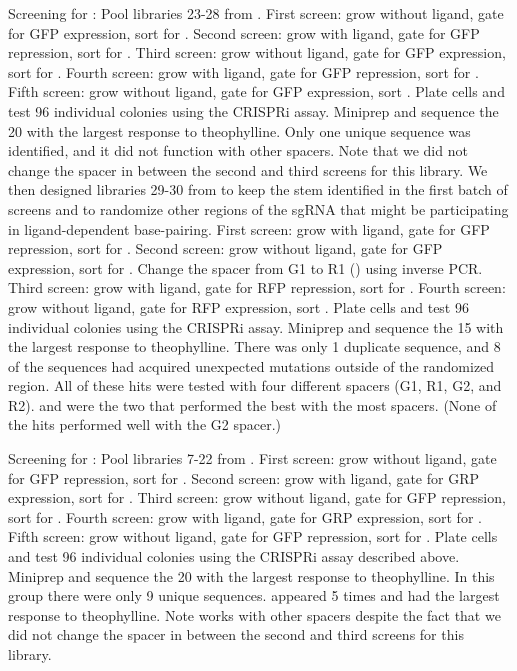 \documentclass[10pt,oneside]{article}
\begin{document}
Screening for \ligrnaF{}: Pool libraries 23-28 from .  First screen: grow without ligand, gate for GFP expression, sort  for .  Second screen: grow with ligand, gate for GFP repression, sort  for .  Third screen: grow without ligand, gate for GFP expression, sort  for .  Fourth screen: grow with ligand, gate for GFP repression, sort  for .  Fifth screen: grow without ligand, gate for GFP expression, sort .  Plate cells and test 96 individual colonies using the CRISPRi assay.  Miniprep and sequence the 20 with the largest response to theophylline.  Only one unique sequence was identified, and it did not function with other spacers.  Note that we did not change the spacer in between the second and third screens for this library.  We then designed libraries 29-30 from  to keep the stem identified in the first batch of screens and to randomize other regions of the sgRNA that might be participating in ligand-dependent base-pairing.  First screen: grow with ligand, gate for GFP repression, sort  for .  Second screen: grow without ligand, gate for GFP expression, sort  for .  Change the spacer from G1 to R1 () using inverse PCR.  Third screen: grow with ligand, gate for RFP repression, sort  for .  Fourth screen: grow without ligand, gate for RFP expression, sort .  Plate cells and test 96 individual colonies using the CRISPRi assay.  Miniprep and sequence the 15 with the largest response to theophylline.  There was only 1 duplicate sequence, and 8 of the sequences had acquired unexpected mutations outside of the randomized region.  All of these hits were tested with four different spacers (G1, R1, G2, and R2).  \ligrnaF{} and \ligrnaFF{} were the two that performed the best with the most spacers.  (None of the hits performed well with the G2 spacer.)

Screening for \ligrnaB{}: Pool libraries 7-22 from .  First screen: grow without ligand, gate for GFP repression, sort  for .  Second screen: grow with ligand, gate for GRP expression, sort  for .  Third screen: grow without ligand, gate for GFP repression, sort  for .  Fourth screen: grow with ligand, gate for GRP expression, sort  for .  Fifth screen: grow without ligand, gate for GFP repression, sort  for .  Plate cells and test 96 individual colonies using the CRISPRi assay described above.  Miniprep and sequence the 20 with the largest response to theophylline.  In this group there were only 9 unique sequences.  \ligrnaB{} appeared 5 times and had the largest response to theophylline.  Note \ligrnaB{} works with other spacers despite the fact that we did not change the spacer in between the second and third screens for this library.
\end{document}
